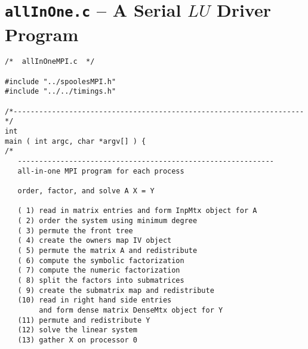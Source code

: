 \vfill \eject
\section{{\tt allInOne.c} -- A Serial $LU$ Driver Program}
\label{section:LU-MPI-driver}

\begin{verbatim}
/*  allInOneMPI.c  */

#include "../spoolesMPI.h"
#include "../../timings.h"

/*--------------------------------------------------------------------*/
int
main ( int argc, char *argv[] ) {
/*
   ------------------------------------------------------------
   all-in-one MPI program for each process

   order, factor, and solve A X = Y

   ( 1) read in matrix entries and form InpMtx object for A
   ( 2) order the system using minimum degree
   ( 3) permute the front tree
   ( 4) create the owners map IV object
   ( 5) permute the matrix A and redistribute
   ( 6) compute the symbolic factorization 
   ( 7) compute the numeric factorization
   ( 8) split the factors into submatrices
   ( 9) create the submatrix map and redistribute
   (10) read in right hand side entries 
        and form dense matrix DenseMtx object for Y
   (11) permute and redistribute Y
   (12) solve the linear system
   (13) gather X on processor 0


\end{verbatim}
